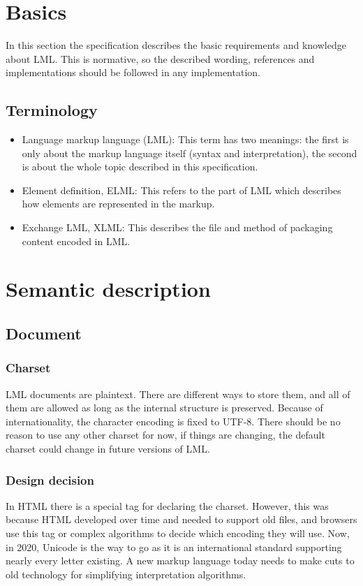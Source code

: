 \documentclass[12pt,a4paper]{article}
\begin{document}
\section{Basics}
In this section the specification describes the basic requirements and knowledge about LML. This is normative, so the described wording, references and implementations should be followed in any implementation.

\subsection{Terminology}
\begin{itemize}
\item Language markup language (LML): This term has two meanings: the first is only about the markup language itself (syntax and interpretation), the second is about the whole topic described in this specification.
\item Element definition, ELML: This refers to the part of LML which describes how elements are represented in the markup.
\item Exchange LML, XLML: This describes the file and method of packaging content encoded in LML.
\end{itemize}

\section{Semantic description}

\subsection{Document}

\subsubsection*{Charset}
LML documents are plaintext. There are different ways to store them, and all of them are allowed as long as the internal structure is preserved. Because of internationality, the character encoding is fixed to UTF-8. There should be no reason to use any other charset for now, if things are changing, the default charset could change in future versions of LML.

\begin{tcolorbox}
\subsubsection*{Design decision}
In HTML there is a special tag for declaring the charset. However, this was because HTML developed over time and needed to support old files, and browsers use this tag or complex algorithms to decide which encoding they will use. Now, in 2020, Unicode is the way to go as it is an international standard supporting nearly every letter existing. A new markup language today needs to make cuts to old technology for simplifying interpretation algorithms.
\end{tcolorbox}
\end{document}
